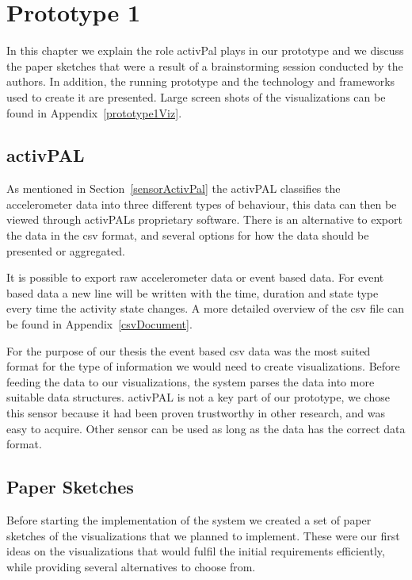 \chapter{Prototype 1}
\label{ch:prototype1}
In this chapter we explain the role activPal plays in our prototype and we discuss the paper sketches that were a result of a brainstorming session conducted by the authors. In addition, the running prototype and the technology and frameworks used to create it are presented. Large screen shots of the visualizations can be found in Appendix~\ref{prototype1Viz}.

\section{activPAL}
As mentioned in Section~\ref{sensorActivPal} the activPAL classifies the accelerometer data into three different types of behaviour, this data can then be viewed through activPALs proprietary software. There is an alternative to export the data in the \gls{csv} format, and several options for how the data should be presented or aggregated. 

It is possible to export raw accelerometer data or event based data. For event based data a new line will be written with the time, duration and state type every time the activity state changes. A more detailed overview of the \gls{csv} file can be found in Appendix~\ref{csvDocument}.

For the purpose of our thesis the event based \gls{csv} data was the most suited format for the type of information we would need to create visualizations. Before feeding the data to our visualizations, the system parses the data into more suitable data structures. activPAL is not a key part of our prototype, we chose this sensor because it had been proven trustworthy in other research, and was easy to acquire. Other sensor can be used as long as the data has the correct data format.

\clearpage

\section{Paper Sketches}
\label{sec:paperSketches}
Before starting the implementation of the system we created a set of paper sketches of the visualizations that we planned to implement. These were our first ideas on the visualizations that would fulfil the initial requirements efficiently, while providing several alternatives to choose from.

